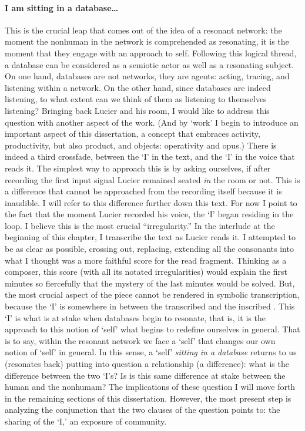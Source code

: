 \paragraph{I am sitting in a database\dots}
This is the crucial leap that comes out of the idea of a resonant network: the moment the nonhuman in the network is comprehended as resonating, it is the moment that they engage with an approach to self. Following this logical thread, a database can be considered as a semiotic actor as well as a resonating subject. On one hand, databases are not networks, they are agents: acting, tracing, and listening within a network. On the other hand, since databases are indeed listening, to what extent can we think of them as listening to themselves listening? Bringing back Lucier and his room, I would like to address this question with another aspect of the work. (And by `work' I begin to introduce an important aspect of this dissertation, a concept that embraces activity, productivity, but also product, and objects: operativity and opus.) There is indeed a third crossfade, between the `I' in the text, and the `I' in the voice that reads it. The simplest way to approach this is by asking ourselves, if after recording the first input signal Lucier remained seated \textit{in} the room or not. This is a difference that cannot be approached from the recording itself because it is inaudible. I will refer to this difference further down this text. For now I point to the fact that the moment Lucier recorded his voice, the `I' began residing in the loop. I believe this is the most crucial ``irregularity.'' In the interlude at the beginning of this chapter, I transcribe the text as Lucier reads it. I attempted to be as clear as possible, crossing out, replacing, extending all the consonants into what I thought was a more faithful score for the read fragment. Thinking as a composer, this score (with all its notated irregularities) would explain the first minutes so fiercefully that the mystery of the last minutes would be solved. But, the most crucial aspect of the piece cannot be rendered in symbolic transcription, because the `I' is somewhere in between the transcribed and the inscribed . This `I' is what is at stake when databases begin to resonate, that is, it is the approach to this notion of `self' what begins to redefine ourselves in general. That is to say, within the resonant network we face a `self' that changes our own notion of `self' in general. In this sense, a `self' \textit{sitting in a database} returns to us (resonates back) putting into question a relationship (a difference): what is the difference between the two `I's? Is is this same difference at stake between the human and the nonhumam? The implications of these question I will move forth in the remaining sections of this dissertation. However, the most present step is analyzing the conjunction that the two clauses of the question points to: the sharing of the `I,' an exposure of community.

